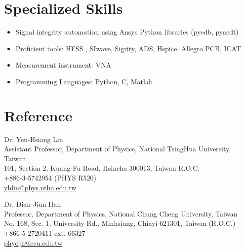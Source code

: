 \documentclass[letterpaper,11pt]{article}
\begin{document}
\section{Specialized Skills}
\begin{itemize}[leftmargin=0.30in,label={\large\textbullet}]
    \itemsep -3pt
     \item Signal integrity automation using Ansys Python libraries (pyedb, pyaedt) 
     \item Proficient tools: HFSS , SIwave, Sigrity, ADS, Hspice, Allegro PCB, ICAT
    \item Measurement instrument: VNA
    \item Programming Languages: Python, C, Matlab
\end{itemize}

\section{Reference}
\begin{itemize}[leftmargin=0.15in, label={}]
    \normalsize{\item{
        {Dr. Yen-Hsiang Lin} \\
        {Assistant Professor, Department of Physics, National TsingHua University, Taiwan} \\
        {101, Section 2, Kuang-Fu Road, Hsinchu 300013, Taiwan R.O.C.}\\
         +886-3-5742954 (PHYS R520) \\
         \href{mailto:yhlin@phys.nthu.edu.tw}{yhlin@phys.nthu.edu.tw}
    }}
    \normalsize{\item{
        {Dr. Dian-Jiun Han} \\
        Professor, Department of Physics, National Chung Cheng University, Taiwan\\
        No. 168, Sec. 1, University Rd., Minhsiung, Chiayi 621301, Taiwan (R.O.C.)\\
         +866-5-2720411 ext. 66327 \\
         \href{mailto:phydjh@ccu.edu.tw}{phydjh@ccu.edu.tw}
    }}
\end{itemize}
\end{document}
